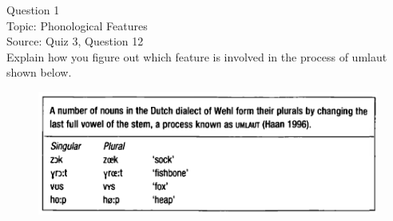 \documentclass[12pt]{article}
\begin{document}
\begin{center}
\textbf{{\color{violet}{\HUGE 20201028 Wednesday\\}}}

\textbf{{\color{violet}{\HUGE ALL EXAMS\\}}}

\end{center}
\newpage

\begin{center}
\textbf{{\color{blue}{\HUGE START OF EXAM\\}}}

\textbf{{\color{blue}{\HUGE Student ID: empty\\}}}

\textbf{{\color{blue}{\HUGE 10:00\\}}}

\end{center}
\newpage

\begin{center}
\textbf{{\color{blue}{\HUGE START OF EXAM\\}}}

\textbf{{\color{blue}{\HUGE Student ID: 36116\\}}}

\textbf{{\color{blue}{\HUGE 10:10\\}}}

\end{center}
\newpage

{\large Question 1}\\

Topic: Phonological Features\\
Source: Quiz 3, Question 12\\

Explain how you figure out which feature is involved in the process of umlaut shown below.\\

\begin{figure}[H]
\includegraphics{../images/dutch.png}
\end{figure}
\end{document}
